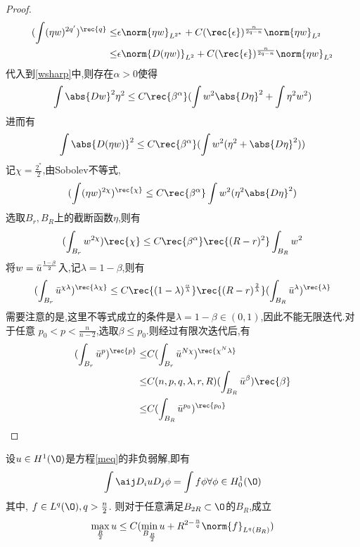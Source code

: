 \begin{proof}
\begin{equation}
\begin{split}
            (\int (\eta w)^{2q'})^\rec{q} \le & \epsilon\norm{\eta w}_{L^{2^*}}+C(\rec{\epsilon})^\frac{n}{2q-n}\norm{\eta w}_{L^2} \\
            \le & \epsilon\norm{D(\eta w)}_{L^2}+C(\rec{\epsilon})^\frac{n }{2q-n}\norm{\eta w}_{L^2}
        \end{split}
    \end{equation}
    代入到\eqref{wsharp}中,则存在$\alpha >0$使得
    \begin{equation}
        \int \abs{Dw}^2\eta^2 \le C \rec{\beta^\alpha}(\int w^2\abs{D\eta}^2+\int \eta^2 w^2)
    \end{equation}
    进而有
    \begin{equation}
        \int \abs{D(\eta w)}^2 \le C\rec{\beta^\alpha}(\int w^2(\eta^2+\abs{D\eta}^2))
    \end{equation}
    记$\chi=\frac{2^*}{2}$,由Sobolev不等式,
    \begin{equation}
        (\int(\eta w)^{2\chi})^\rec{\chi} \le C \rec{\beta^\alpha}\int w^2(\eta^2 \abs{D\eta}^2)
    \end{equation}
    选取$B_r,B_R$上的截断函数$\eta$,则有
    \begin{equation}
        (\int_{B_r}w^{2\chi})\rec{\chi} \le C\rec{\beta^\alpha}\rec{(R-r)^2}\int_{B_R}w^2
    \end{equation}
    将$w={\bar{u}}^{\frac{1-\beta}{2}}$入,记$\lambda=1-\beta$,则有
    \begin{equation}
        (\int_{B_r}\ub^{\chi \lambda})^\rec{\lambda\chi} \le C\rec{(1-\lambda)^\frac{\alpha}{\lambda}}\rec{(R-r)^\frac{2}{\lambda}}(\int_{B_R}\ub^\lambda)^\rec{\lambda}
    \end{equation}
    需要注意的是,这里不等式成立的条件是$\lambda=1-\beta \in (0,1)$,因此不能无限迭代.对于任意 $p_0< p < \frac{n}{n-2}$,选取$\beta \le p_0$.则经过有限次迭代后,有 
    \begin{equation}
        \begin{split}
            (\int_{B_r}\ub^p)^\rec{p} \le & C(\int_{B_r}\ub^{N\chi})^\rec{\chi^N\lambda}  \\
            \le & C(n,p,q,\lambda,r,R)(\int_{B_R}\ub^\beta)\rec{\beta} \\
            \le & C(\int_{B_R}\ub^{p_0})^\rec{p_0}
        \end{split}
    \end{equation}
\end{proof}
\begin{theorem}[Harnack不等式]
    设$u \in H^1(\O)$是方程\eqref{meq}的非负弱解,即有
    \begin{equation}
        \int \aij D_iuD_j\phi=\int f\phi \forall \phi \in H^1_0(\O)
    \end{equation}
    其中, $f \in L^q(\O), q > \frac{n}{2}$. 则对于任意满足$B_{2R}\subset \O$的$B_R$,成立
    \begin{equation}
        \max_{\frac{R}{2}}u \le C(\min_{B_{\frac{R }{2}}}u+R^{2-\frac{n}{q}}\norm{f}_{L^q(B_R)})
    \end{equation}
\end{theorem}
